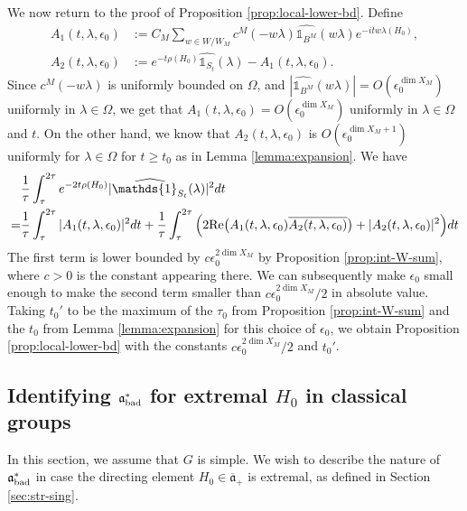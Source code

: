 \documentclass[12pt]{amsart}
\theoremstyle{remark}
\newcommand{\ga}{\mathfrak a}
\begin{document}
We now return to the proof of Proposition \ref{prop:local-lower-bd}.  Define
\begin{align*}
    A_1(t, \lambda, \epsilon_0) &:= C_M \sum_{w \in W / W_M }c^M( - w\lambda)\widehat{\mathds{1}_{B^M}}(w\lambda)   e^{-itw\lambda( H_0)}, \\
    A_2(t, \lambda, \epsilon_0) &:= e^{-t \rho(H_0)} \widehat{\mathds{1}_{S_t}}(\lambda) - A_1(t, \lambda, \epsilon_0).
\end{align*}
Since $c^M(-w \lambda)$ is uniformly bounded on $\Omega$, and $|\widehat{\mathds{1}_{B^M}}(w\lambda)| = O(\epsilon_0^{\dim X_M})$ uniformly in $\lambda \in \Omega$, we get that $A_1(t, \lambda, \epsilon_0) = O(\epsilon_0^{\dim X_M})$ uniformly in $\lambda \in \Omega$ and $t$. On the other hand, we know that $A_2(t, \lambda, \epsilon_0)$ is $O(\epsilon_0^{\dim X_M + 1})$ uniformly for $\lambda \in \Omega$ for $t \geq t_0$ as in Lemma \ref{lemma:expansion}.
We have
\begin{align*}
    &\frac{1}{\tau} \int_{\tau}^{2\tau} e^{-2t \rho(H_0)} |\widehat{\mathds{1}_{S_t}}(\lambda)|^2 dt \\
    = &\frac{1}{\tau} \int_{\tau}^{2 \tau} |A_1(t, \lambda, \epsilon_0)|^2 dt + \frac{1}{\tau} \int_{\tau}^{2 \tau} \Big( 2 \textnormal{Re}\big(A_1(t, \lambda, \epsilon_0) \overline{A_2(t, \lambda, \epsilon_0)} \big) + |A_2(t, \lambda, \epsilon_0)|^2 \Big) dt
\end{align*}
The first term is lower bounded by $c \epsilon_0^{2 \dim X_M}$ by Proposition \ref{prop:int-W-sum}, where $c > 0$ is the constant appearing there. We can subsequently make $\epsilon_0$ small enough to make the second term smaller than $c \epsilon_0^{2 \dim X_M}/2$ in absolute value. Taking $t_0'$ to be the maximum of the $\tau_0$ from Proposition \ref{prop:int-W-sum} and the $t_0$ from Lemma \ref{lemma:expansion} for this choice of $\epsilon_0$, we obtain Proposition \ref{prop:local-lower-bd} with the constants $c \epsilon_0^{2 \dim X_M}/2$ and $t_0'$.


\subsection{Identifying $\ga_{\rm bad}^*$ for extremal $H_0$ in classical groups}\label{sec:hyperplanes}

In this section, we assume that $G$ is simple. We wish to describe the nature of $\ga^*_{\textnormal{bad}}$ in case the directing element $H_0 \in \overline{\ga}_+$ is extremal, as defined in Section \ref{sec:str-sing}.
\end{document}
